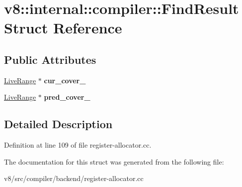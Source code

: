 \hypertarget{structv8_1_1internal_1_1compiler_1_1FindResult}{}\section{v8\+:\+:internal\+:\+:compiler\+:\+:Find\+Result Struct Reference}
\label{structv8_1_1internal_1_1compiler_1_1FindResult}
\subsection*{Public Attributes}
\begin{DoxyCompactItemize}
\item 
\mbox{\label{structv8_1_1internal_1_1compiler_1_1FindResult_a3c85d18e9f664f34c305a65d627c16b4}} 
\mbox{\hyperlink{classv8_1_1internal_1_1compiler_1_1LiveRange}{Live\+Range}} $\ast$ {\bfseries cur\+\_\+cover\+\_\+}
\item 
\mbox{\label{structv8_1_1internal_1_1compiler_1_1FindResult_a8a6009810ce4e54ac11dd460b86aca5e}} 
\mbox{\hyperlink{classv8_1_1internal_1_1compiler_1_1LiveRange}{Live\+Range}} $\ast$ {\bfseries pred\+\_\+cover\+\_\+}
\end{DoxyCompactItemize}


\subsection{Detailed Description}


Definition at line 109 of file register-\/allocator.\+cc.



The documentation for this struct was generated from the following file\+:\begin{DoxyCompactItemize}
\item 
v8/src/compiler/backend/register-\/allocator.\+cc\end{DoxyCompactItemize}
